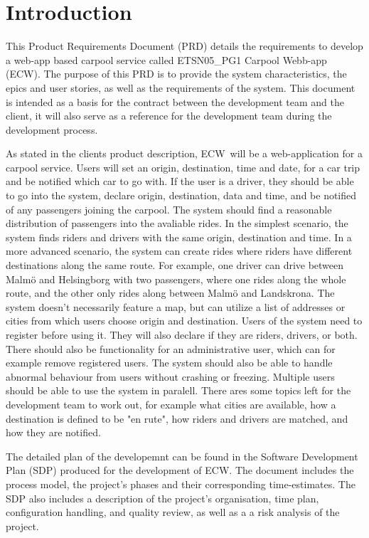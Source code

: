 \documentclass{article}
\newcommand{\name}{ECW\ }
\newcommand{\nameNospace}{ECW}
\begin{document}
\section{Introduction}\label{sec:intro}
This Product Requirements Document (PRD) details the requirements to develop a web-app based carpool service called ETSN05\_PG1 Carpool Webb-app (\nameNospace). The purpose of this PRD is to provide the system characteristics, the epics and user stories, as well as the requirements of the system. This document is intended as a basis for the contract between the development team and the client, it will also serve as a reference for the development team during the development process.

As stated in the clients product description\cite{PH}, \name will be a web-application for a carpool service. Users will set an origin, destination, time and date, for a car trip and be notified which car to go with. If the user is a driver, they should be able to go into the system, declare origin, destination, data and time, and be notified of any passengers joining the carpool. The system should find a reasonable distribution of passengers into the avaliable rides. In the simplest scenario, the system finds riders and drivers with the same origin, destination and time. In a more advanced scenario, the system can create rides where riders have different destinations along the same route. For example, one driver can drive between Malmö and Helsingborg with two passengers, where one rides along the whole route, and the other only rides along between Malmö and Landskrona. The system doesn't necessarily feature a map, but can utilize a list of addresses or cities from which users choose origin and destination. Users of the system need to register before using it. They will also declare if they are riders, drivers, or both. There should also be functionality for an administrative user, which can for example remove registered users. The system should also be able to handle abnormal behaviour from users without crashing or freezing. Multiple users should be able to use the system in paralell. There ares some topics left for the development team to work out, for example what cities are available, how a destination is defined to be "en rute", how riders and drivers are matched, and how they are notified.

The detailed plan of the developemnt can be found in the Software Development Plan (SDP) produced for the development of \nameNospace. The document includes the process model, the project's phases and their corresponding time-estimates. The SDP also includes a description of the project's organisation, time plan, configuration handling, and quality review, as well as a a risk analysis of the project\cite{SDP}.
\end{document}
